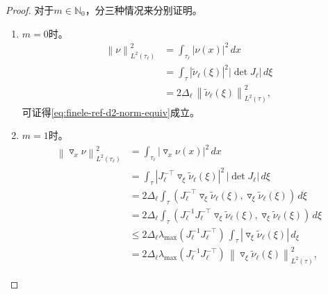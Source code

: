 \begin{proof}
  对于$m \in \mathbb{N}_{0}$，分三种情况来分别证明。
\begin{enumerate}
  \item $m=0$时。
  \begin{equation*}
    \begin{split}
      \left\| \nu \right\|_{L^{2}(\tau_{\ell})}^{2}
      &= \int_{\tau_{\ell}} \left| \nu(x) \right|^{2} \, dx \\
      & = \int_{\tau} \left| \widetilde{\nu}_{\ell} (\xi) \right|^{2}
      \left| \det J_{\ell} \right| \, d \xi \\
      & = 2 \Delta_{\ell} \, \left\| \widetilde{\nu}_{\ell} (\xi) \right\|_{L^{2}(\tau)}^{2},
    \end{split}
  \end{equation*}
  可证得\eqref{eq:finele-ref-d2-norm-equiv}成立。

  \item $m=1$时。
  \begin{equation*}
    \begin{split}
      \left\| \triangledown_{x} \nu \right\|_{L^{2}(\tau_{\ell})}^2
      & = \int_{\tau_{\ell}} \left| \triangledown_{x} \nu(x) \right|^{2} \, dx \\
      & = \int_{\tau}
      \left| J_{\ell}^{- \top} \triangledown_{\xi} \widetilde{\nu}_{\ell} (\xi) \right|^{2} \,
      \left| \det J_{\ell} \right|
      \, d \xi\\
      & = 2 \Delta_{\ell} \int_{\tau}
      \left(
      J_{\ell}^{-\top} \triangledown_{\xi} \widetilde{\nu}_{\ell} (\xi),
      \triangledown_{\xi} \widetilde{\nu}_{\ell} (\xi)
      \right) \,
      d \xi \\
      & = 2 \Delta_{\ell} \int_{\tau}
      \left(
      J_{\ell}^{-1} J_{\ell}^{-\top} \triangledown_{\xi} \widetilde{\nu}_{\ell} (\xi),
      \triangledown_{\xi} \widetilde{\nu}_{\ell} (\xi)
      \right) \, d \xi \\
      & \le 2 \Delta_{\ell} \lambda_{\max} \left(J_{\ell}^{-1} J_{\ell}^{-\top} \right) \,
      \int_{\tau}
      \left|
      \triangledown_{\xi} \widetilde{\nu}_{\ell} (\xi)
      \right| \, d_{\xi} \\
      & = 2 \Delta_{\ell} \lambda_{\max} \left(J_{\ell}^{-1} J_{\ell}^{-\top} \right) \,
      \left\|
      \triangledown_{\xi} \widetilde{\nu}_{\ell} (\xi)
      \right\|_{L^{2}(\tau)}^{2},
    \end{split}
  \end{equation*}


\end{enumerate}
\end{proof}
